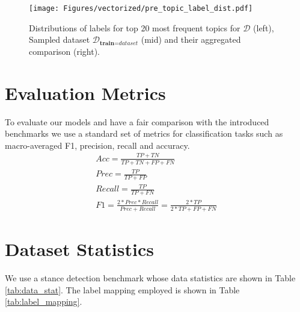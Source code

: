 \documentclass[11pt]{article}
\begin{document}
\begin{figure*}
\centering
\texttt{[image: Figures/vectorized/pre\_topic\_label\_dist.pdf]}
\caption{Distributions of labels for top 20 most frequent topics for $\mathcal{D}$ (left), Sampled dataset $\mathcal{D}_{\textbf{train} = \textit{dataset}}$ (mid) and their aggregated comparison (right).
}
\label{fig:per_topic_big}
\end{figure*}


\section{Evaluation Metrics}

To evaluate our models and have a fair comparison with the introduced benchmarks we use a standard set of metrics for classification tasks such as macro-averaged F1, precision, recall and accuracy.
\begin{gather}
Acc = \frac{TP+TN}{TP+TN+FP+FN} \\
Prec = \frac{TP}{TP+FP} \\
Recall = \frac{TP}{TP+FN} \\
F1 = \frac{2*Prec*Recall}{Prec+Recall} = \frac{2*TP}{2*TP+FP+FN}
\end{gather}


\section{Dataset Statistics}
\label{Appendix:data}
We use a stance detection benchmark \citep{hardalov2021cross} whose data statistics are shown in Table \ref{tab:data_stat}. The label mapping employed is shown in Table \ref{tab:label_mapping}.
\end{document}
